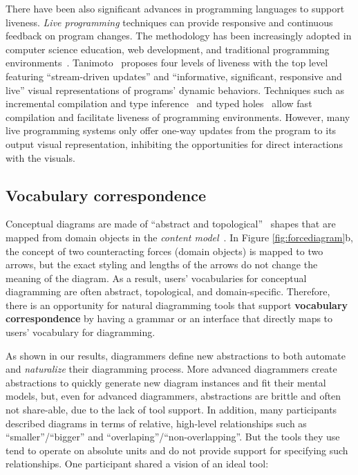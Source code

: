 There have been also significant advances in programming languages to support liveness. \emph{Live programming} techniques can provide responsive and continuous feedback on program changes. The methodology has been increasingly adopted in computer science education, web development, and traditional programming environments~\cite{LiveProgramming, wysiwyc, SEEDE}. Tanimoto~\cite{Viva-Liveness} proposes four levels of liveness with the top level featuring ``stream-driven updates'' and ``informative, significant, responsive and live'' visual representations of programs' dynamic behaviors. Techniques such as incremental compilation and type inference~\cite{superGlue} and typed holes~\cite{typedHoles} allow fast compilation and facilitate liveness of programming environments. However, many live programming systems only offer one-way updates from the program to its output visual representation, inhibiting the opportunities for direct interactions with the visuals.

\subsection{Vocabulary correspondence}

Conceptual diagrams are made of ``abstract and topological''~\cite{designingWithDiagrams} shapes that are mapped from domain objects in the \emph{content model}~\cite{fundamentalDesignVars}. In Figure \ref{fig:forcediagram}b, the concept of two counteracting forces (domain objects) is mapped to two arrows, but the exact styling and lengths of the arrows do not change the meaning of the diagram. As a result, users' vocabularies for conceptual diagramming are often abstract, topological, and domain-specific. Therefore, there is an opportunity for natural diagramming tools that support \textbf{vocabulary correspondence} by having a grammar or an interface that directly maps to users' vocabulary for diagramming. 

As shown in our results, diagrammers define new abstractions to both automate and \emph{naturalize} their diagramming process. More advanced diagrammers create abstractions to quickly generate new diagram instances and fit their mental models, but, even for advanced diagrammers, abstractions are brittle and often not share-able, due to the lack of tool support. In addition, many participants described diagrams in terms of relative, high-level relationships such as ``smaller''/``bigger'' and ``overlaping''/``non-overlapping''. But the tools they use tend to operate on absolute units and do not provide support for specifying such relationships. One participant shared a vision of an ideal tool:


